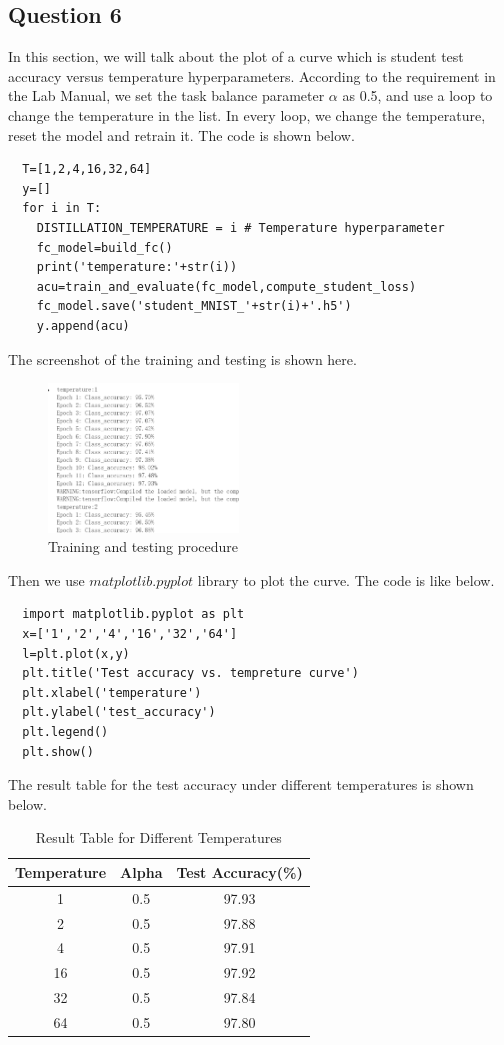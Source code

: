 \documentclass[conference]{IEEEtran}
\begin{document}
  \subsection{Question 6}
  In this section, we will talk about the plot of a curve which is student test accuracy versus temperature hyperparameters. 
  According to the requirement in the Lab Manual, we set the task balance parameter $\alpha$ as 0.5, and use a loop to change the temperature in the list.
  In every loop, we change the temperature, reset the model and retrain it. The code is shown below.
  \begin{lstlisting}
  T=[1,2,4,16,32,64]
  y=[]
  for i in T:
    DISTILLATION_TEMPERATURE = i # Temperature hyperparameter
    fc_model=build_fc()
    print('temperature:'+str(i))
    acu=train_and_evaluate(fc_model,compute_student_loss)
    fc_model.save('student_MNIST_'+str(i)+'.h5')
    y.append(acu)
  \end{lstlisting}
  The screenshot of the training and testing is shown here.
  \begin{figure}[h] 
      \centering
      \includegraphics[width=0.45\textwidth]{./graphs/T1Q6_train.png}
      \caption{Training and testing procedure}
      \label{Fig.t1q3e}
  \end{figure}
  Then we use $matplotlib.pyplot$ library to plot the curve.
  The code is like below.
  \begin{lstlisting}
  import matplotlib.pyplot as plt
  x=['1','2','4','16','32','64']
  l=plt.plot(x,y)
  plt.title('Test accuracy vs. tempreture curve')
  plt.xlabel('temperature')
  plt.ylabel('test_accuracy')
  plt.legend()
  plt.show()
  \end{lstlisting}
  The result table for the test accuracy under different temperatures is shown below.
  \begin{table}[h]
      \centering
      \begin{tabular}{|c|c|c|}
      \hline
      Temperature & Alpha & Test Accuracy(\%)      \\ \hline
      1           & 0.5   & 97.93   \\ \hline
      2           & 0.5   & 97.88 \\ \hline
      4           & 0.5   & 97.91 \\ \hline
      16          & 0.5   & 97.92  \\ \hline
      32          & 0.5   & 97.84 \\ \hline
      64          & 0.5   & 97.80 \\ \hline
      \end{tabular}
      \caption{Result Table for Different Temperatures}
  \end{table}\par
\end{document}
